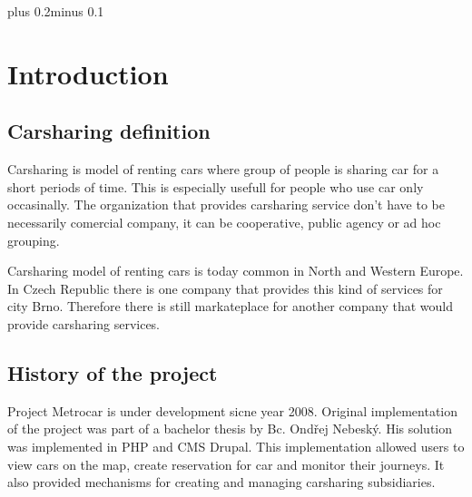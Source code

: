 \documentclass[11pt,twoside,a4paper]{book}
\begin{document}
\listoftables



\mainbodystarts
\normalfont
{}\baselineskip plus 0.2\baselineskip minus 0.1\baselineskip



% 
% 

\chapter{Introduction} \section{Carsharing definition} Carsharing is model of
renting cars where group of people is sharing car  for a short periods of
time. This is especially  usefull for people who use car only occasinally. The
organization that provides carsharing service don't have to be necessarily
comercial company, it can be cooperative, public agency or ad hoc grouping\cite{wiki:carsharing}. 

Carsharing model of renting cars is today common in North and Western Europe. In Czech Republic 
there is one company that provides this kind of services for city Brno\cite{brno}. Therefore there is still markateplace 
for another company that would provide carsharing services. 
\section{History of the project}
Project Metrocar is under development sicne year 2008. Original implementation of the project was part 
of a bachelor thesis by Bc. Ondřej Nebeský. His solution was implemented in PHP and CMS Drupal. This implementation 
allowed users to view cars on the map, create reservation for car and monitor their journeys. It also provided mechanisms 
for creating and managing carsharing subsidiaries\cite{Nebes09}. 
\end{document}
